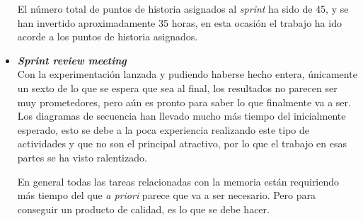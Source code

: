 \begin{itemize}
El número total de puntos de historia asignados al \textit{sprint} ha sido de 45, y se han invertido aproximadamente 35 horas, en esta ocasión el trabajo ha ido acorde a los puntos de historia asignados.

\item \textbf{\textit{Sprint review meeting}}\\
Con la experimentación lanzada y pudiendo haberse hecho entera, únicamente un sexto de lo que se espera que sea al final, los resultados no parecen ser muy prometedores, pero aún es pronto para saber lo que finalmente va a ser.\\

Los diagramas de secuencia han llevado mucho más tiempo del inicialmente esperado, esto se debe a la poca experiencia realizando este tipo de actividades y que no son el principal atractivo, por lo que el trabajo en esas partes se ha visto ralentizado.

En general todas las tareas relacionadas con la memoria están requiriendo más tiempo del que \textit{a priori} parece que va a ser necesario. Pero para conseguir un producto de calidad, es lo que se debe hacer.

\end{itemize}

